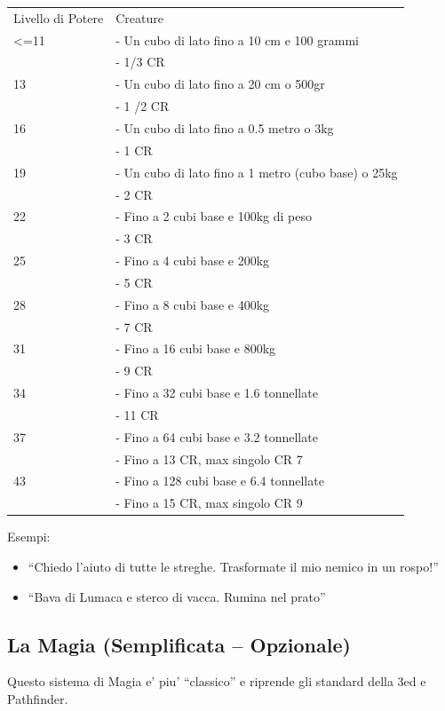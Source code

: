 \documentclass[a4paper,11pt,twoside,openany]{dndbook}
\begin{document}
\bigskip

\begin{tabular}[c]{@{}ll@{}}
\toprule 
Livello di Potere & Creature\tabularnewline
<=11& - Un cubo di lato fino a 10 cm e 100 grammi\\
&- 1/3 CR\\
13& - Un cubo di lato fino a 20 cm o 500gr\\
&- 1 /2 CR\\
16& - Un cubo di lato fino a 0.5 metro o 3kg\\
&- 1 CR\\
19& - Un cubo di lato fino a 1 metro (cubo base) o 25kg\\
&- 2 CR\\
22& - Fino a 2 cubi base e 100kg di peso\\
&- 3 CR\\
25& - Fino a 4 cubi base e 200kg\\
&- 5 CR\\
28& - Fino a 8 cubi base e 400kg\\
&- 7 CR\\
31& - Fino a 16 cubi base e 800kg\\
&- 9 CR\\
34& - Fino a 32 cubi base e 1.6 tonnellate\\
&- 11 CR\\
37& - Fino a 64 cubi base e 3.2 tonnellate\\
&- Fino a 13 CR, max singolo CR 7\\
43& - Fino a 128 cubi base e 6.4 tonnellate\\
&- Fino a 15 CR, max singolo CR 9\\
\bottomrule
\end{tabular}

\bigskip


Esempi:
\begin{itemize}
\item 
``Chiedo l'aiuto di tutte le streghe. Trasformate il mio nemico in un rospo!'' 
\item 
``Bava di Lumaca e sterco di vacca. Rumina nel prato'' 
\end{itemize}

\pagebreak

\subsection{La Magia (Semplificata -- Opzionale)}


Questo sistema di Magia e' piu' ``classico'' e riprende gli standard della 3ed e Pathfinder.
\end{document}
